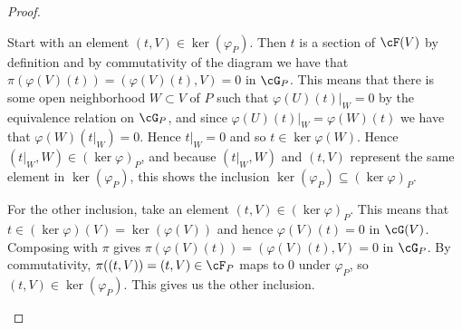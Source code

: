 \begin{problemset}
\begin{proof}
\begin{enumerate}[(a)]
\begin{center}
				\end{center}
				Start with an element $(t,V) \in \ker (\varphi_P)$. Then $t$ is a section of $\cF(V)$ by definition and by commutativity of the diagram we have that $\pi(\varphi(V)(t)) = (\varphi(V)(t),V) = 0$ in $\cG_P$. This means that there is some open neighborhood $W\subset V$ of $P$ such that $\varphi(U)(t)|_W = 0$ by the equivalence relation on $\cG_P$, and since $\varphi(U)(t)|_W = \varphi(W)(t)$ we have that $\varphi(W)(t|_W) = 0$. Hence $t|_W = 0$ and so $t \in \ker\varphi(W)$. Hence $(t|_W,W) \in (\ker \varphi)_P$, and because $(t|_W,W)$ and $(t,V)$ represent the same element in $\ker (\varphi_P)$, this shows the inclusion $\ker(\varphi_P) \subseteq (\ker \varphi)_P$.

				For the other inclusion, take an element $(t,V) \in (\ker\varphi)_P$. This means that $t \in (\ker\varphi)(V) = \ker(\varphi(V))$ and hence $\varphi(V)(t) = 0$ in $\cG(V)$. Composing with $\pi$ gives $\pi(\varphi(V)(t)) = (\varphi(V)(t),V) = 0$ in $\cG_P$. By commutativity, $\pi((t,V)) = (t,V)\in \cF_P$ maps to $0$ under $\varphi_P$, so $(t,V)\in \ker(\varphi_P)$. This gives us the other inclusion.

				\bigskip


\end{enumerate}
\end{proof}
\end{problemset}
